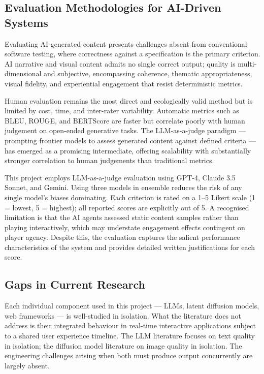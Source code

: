 \documentclass[12pt,a4paper]{article}
\begin{document}
\subsection{Evaluation Methodologies for AI-Driven Systems}

Evaluating AI-generated content presents challenges absent from conventional software testing, where correctness against a specification is the primary criterion. AI narrative and visual content admits no single correct output; quality is multi-dimensional and subjective, encompassing coherence, thematic appropriateness, visual fidelity, and experiential engagement that resist deterministic metrics.

Human evaluation remains the most direct and ecologically valid method but is limited by cost, time, and inter-rater variability. Automatic metrics such as BLEU, ROUGE, and BERTScore are faster but correlate poorly with human judgement on open-ended generative tasks. The LLM-as-a-judge paradigm --- prompting frontier models to assess generated content against defined criteria --- has emerged as a promising intermediate, offering scalability with substantially stronger correlation to human judgements than traditional metrics.

This project employs LLM-as-a-judge evaluation using GPT-4, Claude 3.5 Sonnet, and Gemini. Using three models in ensemble reduces the risk of any single model's biases dominating. Each criterion is rated on a 1--5 Likert scale (1 = lowest, 5 = highest); all reported scores are explicitly out of 5. A recognised limitation is that the AI agents assessed static content samples rather than playing interactively, which may understate engagement effects contingent on player agency. Despite this, the evaluation captures the salient performance characteristics of the system and provides detailed written justifications for each score.

    \subsection{Gaps in Current Research}

Each individual component used in this project --- LLMs, latent diffusion models, web frameworks --- is well-studied in isolation. What the literature does not address is their integrated behaviour in real-time interactive applications subject to a shared user experience timeline. The LLM literature focuses on text quality in isolation; the diffusion model literature on image quality in isolation. The engineering challenges arising when both must produce output concurrently are largely absent.
\end{document}
